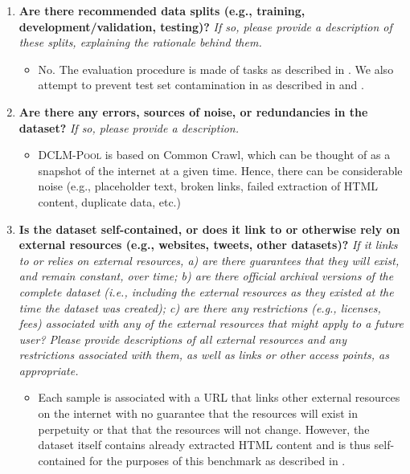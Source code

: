 \documentclass{article}
\newcommand{\rawpool}{\textsc{DCLM-Pool}\xspace}
\newcommand{\commoncrawl}{Common Crawl\xspace}
\begin{document}
\begin{enumerate}[label=Q\arabic*, resume]
\item \textbf{Are there recommended data splits (e.g., training, development/validation, testing)?} \textit{If so, please provide a description of these splits, explaining the rationale behind them.}

\begin{itemize}
\item No. The evaluation procedure is made of tasks as described in . We also attempt to prevent test set contamination in as described in  and .
\end{itemize}

\item \textbf{Are there any errors, sources of noise, or redundancies in the dataset?} \textit{If so, please provide a description.}

\begin{itemize}
\item \rawpool is based on \commoncrawl, which can be thought of as a snapshot of the internet at a given time. Hence, there can be considerable noise (e.g., placeholder text, broken links, failed extraction of HTML content, duplicate data, etc.)
\end{itemize}

\item \textbf{Is the dataset self-contained, or does it link to or otherwise rely on external resources (e.g., websites, tweets, other datasets)?} \textit{If it links to or relies on external resources, a) are there guarantees that they will exist, and remain constant, over time; b) are there official archival versions of the complete dataset (i.e., including the external resources as they existed at the time the dataset was created); c) are there any restrictions (e.g., licenses, fees) associated with any of the external resources that might apply to a future user? Please provide descriptions of all external resources and any restrictions associated with them, as well as links or other access points, as appropriate.}

\begin{itemize}
\item Each sample is associated with a URL that links other external resources on the internet with no guarantee that the resources will exist in perpetuity or that that the resources will not change.
However, the dataset itself contains already extracted HTML content and is thus self-contained for the purposes of this benchmark as described in .
\end{itemize}


\end{enumerate}
\end{document}
